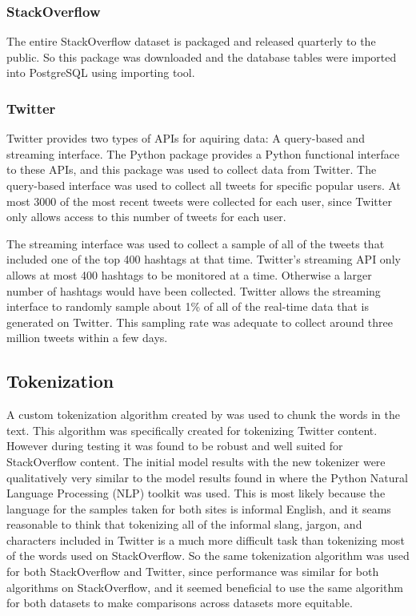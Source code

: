 \documentclass[man,floatsintext,donotrepeattitle]{apa6}
\begin{document}
\subsubsection{StackOverflow}

The entire StackOverflow dataset is packaged and released quarterly to the public.
So this package was downloaded and the database tables were imported into PostgreSQL using \textcite{so2db} importing tool.

\subsubsection{Twitter}

Twitter provides two types of APIs for aquiring data: A query-based and streaming interface.
The \textcite{Tweepy} Python package provides a Python functional interface to these APIs, and this package was used to collect data from Twitter.
The query-based interface was used to collect all tweets for specific popular users.
At most \num{3000} of the most recent tweets were collected for each user, since Twitter only allows access to this number of tweets for each user.

The streaming interface was used to collect a sample of all of the tweets that included one of the top 400 hashtags at that time.
Twitter's streaming API only allows at most 400 hashtags to be monitored at a time.
Otherwise a larger number of hashtags would have been collected.
Twitter allows the streaming interface to randomly sample about 1\% of all of the real-time data that is generated on Twitter.
This sampling rate was adequate to collect around three million tweets within a few days.

\subsection{Tokenization}

A custom tokenization algorithm created by \textcite{Owoputi2013} was used to chunk the words in the text.
This algorithm was specifically created for tokenizing Twitter content.
However during testing it was found to be robust and well suited for StackOverflow content.
The initial model results with the new tokenizer were qualitatively very similar to the model results found in \textcite{Stanley2013} where the Python Natural Language Processing (NLP) toolkit \parencite{Bird2009} was used.
This is most likely because the language for the samples taken for both sites is informal English,
and it seams reasonable to think that tokenizing all of the informal slang, jargon, and characters included in Twitter is a much more difficult task than tokenizing most of the words used on StackOverflow.
So the same tokenization algorithm was used for both StackOverflow and Twitter, since performance was similar for both algorithms on StackOverflow,
and it seemed beneficial to use the same algorithm for both datasets to make comparisons across datasets more equitable.
\end{document}
